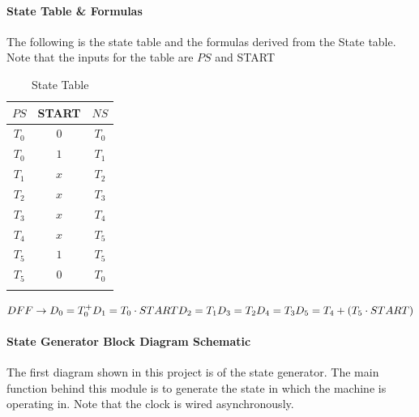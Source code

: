 \documentclass[11pt,a4paper,english]{article}
\begin{document}
  \paragraph*{State Table \& Formulas}
  The following is the state table and the formulas derived from the State table. Note that the inputs for the table are $PS$ and START %
  \begin{table}[H]
    \centering
    \caption{State Table}
    \begin{tabular}{c|c|c}%
      \toprule%
          $PS$    &  START &     $NS$      \\
      \midrule%
          $T_0$   &   $0$    &     $T_0$     \\\hdashline%
          $T_0$   &   $1$    &     $T_1$     \\\hdashline%
          $T_1$   &   $x$    &     $T_2$     \\\hdashline%
          $T_2$   &   $x$    &     $T_3$     \\\hdashline%
          $T_3$   &   $x$    &     $T_4$     \\\hdashline%
          $T_4$   &   $x$    &     $T_5$     \\\hdashline%
          $T_5$   &   $1$    &     $T_5$     \\\hdashline%
          $T_5$   &   $0$    &     $T_0$     \\\hdashline%
    \end{tabular}
  \end{table}

  \begin{math}
    DFF \rightarrow D_0 = T_0^+ \\ 
    D_1 = T_0 \cdot START \\
    D_2 = T_1 \\
    D_3 = T_2 \\ 
    D_4 = T_3 \\
    D_5 = T_4 + (T_5 \cdot START)
  \end{math}

\pagebreak

  \paragraph*{State Generator Block Diagram Schematic}
   The first diagram shown in this project is of the state generator. The main function behind this module is to generate the state in which the machine is operating in. Note that the clock is wired asynchronously.
\end{document}
